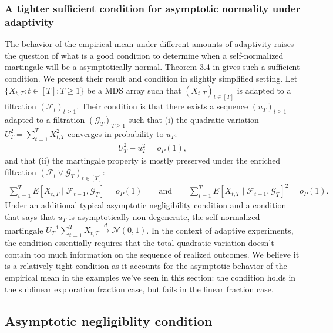 \subsubsection{A tighter sufficient condition for asymptotic normality under adaptivity} The behavior of the empirical mean under different amounts of adaptivity raises the question of what is a good condition to determine when a self-normalized martingale will be a asymptotically normal. Theorem 3.4 in \cite{hall2014martingale} gives such a sufficient condition. We present their result and condition in slightly simplified setting. Let $\{X_{t,T} : t \in [T]: T \geq 1\}$ be a MDS array such that $(X_{t,T})_{t \in [T]}$ is adapted to a filtration $(\mathcal{F}_t)_{t \geq 1}$. Their condition is that there exists a sequence $(u_T)_{t \geq 1}$ adapted to a filtration $(\mathcal{G}_T)_{T \geq 1}$ such that (i) the quadratic variation $U_T^2 = \sum_{t=1}^T X_{t,T}^2$ converges in probability to $u_T$:
\begin{align*}
    U_T^2 - u_T^2 = o_P(1),
\end{align*}
and that (ii) the martingale property is mostly preserved under the enriched filtration $(\mathcal{F}_t \vee \mathcal{G}_T)_{t \in [T]}$:
\begin{align*}
    \sum_{t=1}^T E[X_{t,T}\mid \mathcal{F}_{t-1}, \mathcal{G}_T ] = o_P(1) \qquad \text{and} \qquad \sum_{t=1}^T E[X_{t,T}\mid \mathcal{F}_{t-1}, \mathcal{G}_T ]^2 = o_P(1).
\end{align*}
Under an additional typical asymptotic negligibility condition and a condition that says that $u_T$ is asymptotically non-degenerate, the self-normalized martingale $U_T^{-1} \sum_{t=1}^T X_{t,T} \xrightarrow{d} \mathcal{N}(0,1)$. In the context of adaptive experiments, the condition essentially requires that the total quadratic variation doesn't contain too much information on the sequence of realized outcomes. We believe it is a relatively tight condition as it accounts for the asymptotic behavior of the empirical mean in the examples we've seen in this section: the condition holds in the sublinear exploration fraction case, but fails in the linear fraction case.

\subsection{Asymptotic negligiblity condition}

